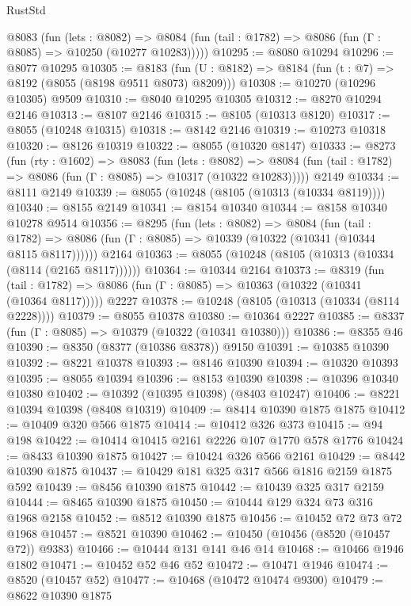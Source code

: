 \begin{lexlean}{RustStd}
\begin{coremodule}
    @8083
      (fun (lets : @8082) =>
      @8084 (fun (tail : @1782) => @8086 (fun (Γ : @8085) => @10250 (@10277 @10283)))))
@10295 := @8080 @10294
@10296 := @8077 @10295
@10305 := @8183 (fun (U : @8182) => @8184 (fun (t : @7) => @8192 (@8055 (@8198 @9511 @8073) @8209)))
@10308 := @10270 (@10296 @10305) @9509
@10310 := @8040 @10295 @10305
@10312 := @8270 @10294 @2146
@10313 := @8107 @2146
@10315 := @8105 (@10313 @8120)
@10317 := @8055 (@10248 @10315)
@10318 := @8142 @2146
@10319 := @10273 @10318
@10320 := @8126 @10319
@10322 := @8055 (@10320 @8147)
@10333 := @8273
    (fun (rty : @1602) =>
    @8083
      (fun (lets : @8082) =>
      @8084 (fun (tail : @1782) => @8086 (fun (Γ : @8085) => @10317 (@10322 @10283)))))
    @2149
@10334 := @8111 @2149
@10339 := @8055 (@10248 (@8105 (@10313 (@10334 @8119))))
@10340 := @8155 @2149
@10341 := @8154 @10340
@10344 := @8158 @10340 @10278 @9514
@10356 := @8295
    (fun (lets : @8082) =>
    @8084
      (fun (tail : @1782) =>
      @8086 (fun (Γ : @8085) => @10339 (@10322 (@10341 (@10344 @8115 @8117))))))
    @2164
@10363 := @8055 (@10248 (@8105 (@10313 (@10334 (@8114 (@2165 @8117))))))
@10364 := @10344 @2164
@10373 := @8319
    (fun (tail : @1782) => @8086 (fun (Γ : @8085) => @10363 (@10322 (@10341 (@10364 @8117)))))
    @2227
@10378 := @10248 (@8105 (@10313 (@10334 (@8114 @2228))))
@10379 := @8055 @10378
@10380 := @10364 @2227
@10385 := @8337 (fun (Γ : @8085) => @10379 (@10322 (@10341 @10380)))
@10386 := @8355 @46
@10390 := @8350 (@8377 (@10386 @8378)) @9150
@10391 := @10385 @10390
@10392 := @8221 @10378
@10393 := @8146 @10390
@10394 := @10320 @10393
@10395 := @8055 @10394
@10396 := @8153 @10390
@10398 := @10396 @10340 @10380
@10402 := @10392 (@10395 @10398) (@8403 @10247)
@10406 := @8221 @10394 @10398 (@8408 @10319)
@10409 := @8414 @10390 @1875 @1875
@10412 := @10409 @320 @566 @1875
@10414 := @10412 @326 @373
@10415 := @94 @198
@10422 := @10414 @10415 @2161 @2226 @107 @1770 @578 @1776
@10424 := @8433 @10390 @1875
@10427 := @10424 @326 @566 @2161
@10429 := @8442 @10390 @1875
@10437 := @10429 @181 @325 @317 @566 @1816 @2159 @1875 @592
@10439 := @8456 @10390 @1875
@10442 := @10439 @325 @317 @2159
@10444 := @8465 @10390 @1875
@10450 := @10444 @129 @324 @73 @316 @1968 @2158
@10452 := @8512 @10390 @1875
@10456 := @10452 @72 @73 @72 @1968
@10457 := @8521 @10390
@10462 := @10450 (@10456 (@8520 (@10457 @72)) @9383)
@10466 := @10444 @131 @141 @46 @14
@10468 := @10466 @1946 @1802
@10471 := @10452 @52 @46 @52
@10472 := @10471 @1946
@10474 := @8520 (@10457 @52)
@10477 := @10468 (@10472 @10474 @9300)
@10479 := @8622 @10390 @1875

\end{coremodule}
\end{lexlean}
